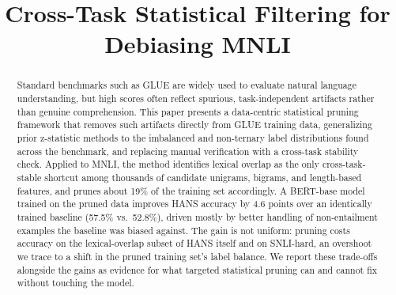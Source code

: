 \documentclass[conference]{IEEEtran}
\begin{document}
\title{Cross-Task Statistical Filtering for Debiasing MNLI}

\author{
\and
{}
\and
{}
}

\maketitle

\begin{abstract}
Standard benchmarks such as GLUE are widely used to evaluate natural language understanding, but high scores often reflect spurious, task-independent artifacts rather than genuine comprehension. This paper presents a data-centric statistical pruning framework that removes such artifacts directly from GLUE training data, generalizing prior z-statistic methods to the imbalanced and non-ternary label distributions found across the benchmark, and replacing manual verification with a cross-task stability check. Applied to MNLI, the method identifies lexical overlap as the only cross-task-stable shortcut among thousands of candidate unigrams, bigrams, and length-based features, and prunes about 19\% of the training set accordingly. A BERT-base model trained on the pruned data improves HANS accuracy by 4.6 points over an identically trained baseline (57.5\% vs.\ 52.8\%), driven mostly by better handling of non-entailment examples the baseline was biased against. The gain is not uniform: pruning costs accuracy on the lexical-overlap subset of HANS itself and on SNLI-hard, an overshoot we trace to a shift in the pruned training set's label balance. We report these trade-offs alongside the gains as evidence for what targeted statistical pruning can and cannot fix without touching the model.
\end{abstract}
\end{document}
